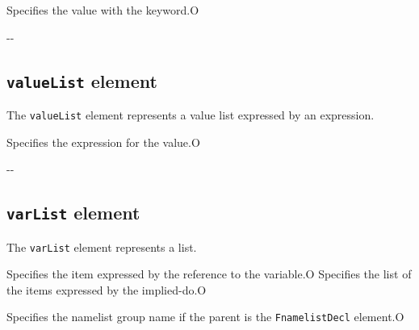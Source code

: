 \begin{XcodeMLChildElements}
{Specifies the value with the keyword.}{O}
\end{XcodeMLChildElements}

\begin{XcodeMLAttributes}
\XcodeMLAttrDef{-}{-}
{-}{-}
\end{XcodeMLAttributes}


\subsection{ {\tt valueList} element}

The {\tt valueList} element represents a value list expressed by an expression.


\begin{XcodeMLChildElements}
{Specifies the expression for the value.}{O}
\end{XcodeMLChildElements}

\begin{XcodeMLAttributes}
\XcodeMLAttrDef{-}{-}
{-}{-}
\end{XcodeMLAttributes}


\subsection{ {\tt varList} element}

The {\tt varList} element represents a list.


\begin{XcodeMLChildElements}
{Specifies the item expressed by the reference to the variable.}{O}
{Specifies the list of the items expressed by the implied-do.}{O}
\end{XcodeMLChildElements}

\begin{XcodeMLAttributes}
{Specifies the namelist group name if the parent is the {\tt FnamelistDecl} element.}{O}
\end{XcodeMLAttributes}



